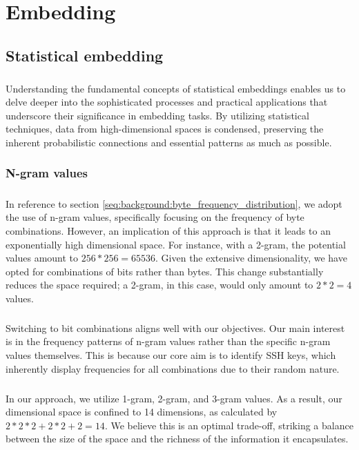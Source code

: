 \chapter{Embedding}\label{chap:embedding}

\section{Statistical embedding}
    \paragraph{}Understanding the fundamental concepts of statistical embeddings enables us to delve deeper into the sophisticated processes and practical applications that underscore their significance in embedding tasks. By utilizing statistical techniques, data from high-dimensional spaces is condensed, preserving the inherent probabilistic connections and essential patterns as much as possible.

    \subsection{N-gram values}
        \paragraph{}In reference to section \ref{seq:background:byte_frequency_distribution}, we adopt the use of n-gram values, specifically focusing on the frequency of byte combinations. However, an implication of this approach is that it leads to an exponentially high dimensional space. For instance, with a 2-gram, the potential values amount to $256*256=65536$. Given the extensive dimensionality, we have opted for combinations of bits rather than bytes. This change substantially reduces the space required; a 2-gram, in this case, would only amount to $2*2=4$ values.

        \paragraph{}Switching to bit combinations aligns well with our objectives. Our main interest is in the frequency patterns of n-gram values rather than the specific n-gram values themselves. This is because our core aim is to identify SSH keys, which inherently display frequencies for all combinations due to their random nature.

        \paragraph{}In our approach, we utilize 1-gram, 2-gram, and 3-gram values. As a result, our dimensional space is confined to 14 dimensions, as calculated by $2*2*2+2*2+2=14$. We believe this is an optimal trade-off, striking a balance between the size of the space and the richness of the information it encapsulates.

